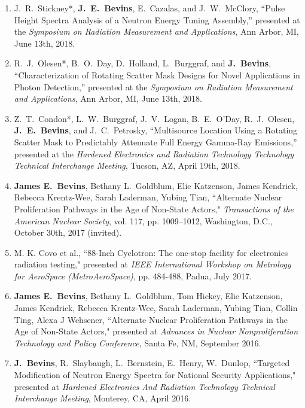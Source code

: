 \begin{enumerate}
  \item J.\ R.\ Stickney*, \textbf{J.\ E.\ Bevins}, E.\ Cazalas, and J.\ W.\ McClory, ``Pulse Height Spectra Analysis of a Neutron Energy Tuning Assembly,” presented at the \textit{Symposium on Radiation Measurement and Applications}, Ann Arbor, MI, June 13th, 2018.

  \item R.\ J.\ Olesen*, B.\ O.\ Day, D.\ Holland, L.\ Burggraf, and \textbf{J.\ Bevins}, ``Characterization of Rotating Scatter Mask Designs for Novel Applications in Photon Detection,” presented at the \textit{Symposium on Radiation Measurement and Applications}, Ann Arbor, MI, June 13th, 2018.

  \item Z.\ T.\ Condon*, L.\ W.\ Burggraf, J.\ V.\ Logan, B.\ E.\ O’Day, R.\ J.\ Olesen, \textbf{J.\ E.\ Bevins}, and J.\ C.\ Petrosky, ``Multisource Location Using a Rotating Scatter Mask to Predictably Attenuate Full Energy Gamma-Ray Emissions,” presented at the \textit{Hardened Electronics and Radiation Technology Technology Technical Interchange Meeting}, Tucson, AZ, April 19th, 2018.
  
  \item \textbf{James E.\ Bevins}, Bethany L.\ Goldblum, Elie Katzenson, James Kendrick, Rebecca Krentz-Wee, Sarah Laderman, Yubing Tian, ``Alternate Nuclear Proliferation Pathways in the Age of Non-State Actors," \textit{Transactions of the American Nuclear Society}, vol. 117, pp. 1009–1012, Washington, D.C., October 30th, 2017 (invited).
  
  \item M. K. Covo et al., ``88-Inch Cyclotron: The one-stop facility for electronics radiation testing," presented at \textit{IEEE International Workshop on Metrology for AeroSpace (MetroAeroSpace)}, pp. 484-488, Padua, July 2017.

  \item \textbf{James E.\ Bevins}, Bethany L.\ Goldblum, Tom Hickey, Elie Katzenson, James Kendrick, Rebecca Krentz-Wee, Sarah Laderman, Yubing Tian, Collin Ting, Alexa J Wehsener, ``Alternate Nuclear Proliferation Pathways in the Age of Non-State Actors," presented at \textit{Advances in Nuclear Nonproliferation Technology and Policy Conference}, Santa Fe, NM, September 2016.

  \item \textbf{J.\ Bevins}, R.\ Slaybaugh, L.\ Bernstein, E.\ Henry, W.\ Dunlop, ``Targeted Modification of Neutron Energy Spectra for National Security Applications," presented at \textit{Hardened Electronics And Radiation Technology Technical Interchange Meeting}, Monterey, CA, April 2016. 


\end{enumerate}
